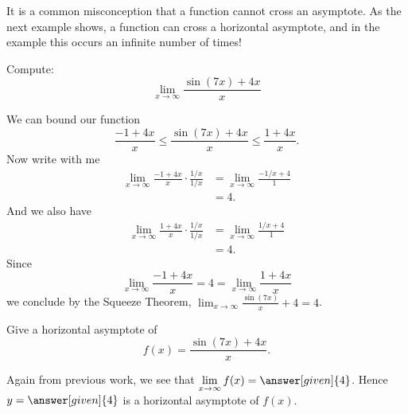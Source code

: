 \documentclass{ximera}
\begin{document}
It is a common misconception that a function cannot cross an
asymptote. As the next example shows, a function can cross a horizontal
asymptote, and in the example this occurs an infinite number of times!


\begin{example}
Compute:
\[
\lim_{x\to \infty} \frac{\sin(7x)+4x}{x}
\]
\begin{image}
\end{image}

\begin{explanation}
We can bound our function
\[
\frac{-1+4x}{x} \le \frac{\sin(7x)+4x}{x} \le \frac{1+4x}{x}.
\]
Now write with me
\begin{align*}
\displaystyle\lim_{x\to\infty}\frac{-1+4x}{x} \cdot \frac{1/x}{1/x} &= \lim_{x\to\infty}\frac{-1/x+4}{1}\\
&=4.
\end{align*}
And we also have
\begin{align*}
\displaystyle\lim_{x\to\infty}\frac{1+4x}{x} \cdot \frac{1/x}{1/x} &= \lim_{x\to\infty}\frac{1/x+4}{1}\\
&=4.
\end{align*}
Since 
\[
\lim_{x\to \infty} \frac{-1+4x}{x}  = 4 = \lim_{x\to \infty}\frac{1+4x}{x} 
\] 
we conclude by the Squeeze Theorem,
$\displaystyle\lim_{x\to\infty}\frac{\sin(7x)}{x}+4 = 4$.
\end{explanation}
\end{example}

\begin{example}
Give a horizontal asymptote of
\[
f(x) = \frac{\sin(7x)+4x}{x}.
\]
\begin{explanation}
Again from previous work, we see that $\displaystyle\lim_{x\to \infty} f(x) =
\answer[given]{4}$. Hence $y=\answer[given]{4}$ is a horizontal asymptote of $f(x)$.
\end{explanation}
\end{example}
\end{document}

